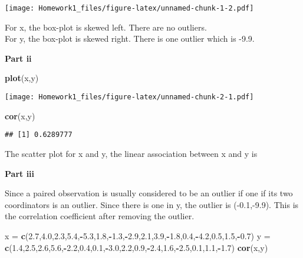 \documentclass[
]{article}
\newenvironment{Shaded}{\begin{snugshade}}{\end{snugshade}}
\newcommand{\FloatTok}[1]{\textcolor[rgb]{0.00,0.00,0.81}{#1}}
\newcommand{\FunctionTok}[1]{\textcolor[rgb]{0.13,0.29,0.53}{\textbf{#1}}}
\newcommand{\NormalTok}[1]{#1}
\newcommand{\OtherTok}[1]{\textcolor[rgb]{0.56,0.35,0.01}{#1}}
\newcommand{\SpecialCharTok}[1]{\textcolor[rgb]{0.81,0.36,0.00}{\textbf{#1}}}
\begin{document}
\texttt{[image: Homework1\_files/figure-latex/unnamed-chunk-1-2.pdf]}

For x, the box-plot is skewed left. There are no outliers.\\
For y, the box-plot is skewed right. There is one outlier which is -9.9.

\textbf{Part ii}

\begin{Shaded}
\begin{Highlighting}[]
\FunctionTok{plot}\NormalTok{(x,y)}
\end{Highlighting}
\end{Shaded}

\texttt{[image: Homework1\_files/figure-latex/unnamed-chunk-2-1.pdf]}

\begin{Shaded}
\begin{Highlighting}[]
\FunctionTok{cor}\NormalTok{(x,y)}
\end{Highlighting}
\end{Shaded}

\begin{verbatim}
## [1] 0.6289777
\end{verbatim}

The scatter plot for x and y, the linear association between x and y is

\textbf{Part iii}

Since a paired observation is usually considered to be an outlier if one
if its two coordinators is an outlier. Since there is one in y, the
outlier is (-0.1,-9.9). This is the correlation coefficient after
removing the outlier.

\begin{Shaded}
\begin{Highlighting}[]
\NormalTok{x }\OtherTok{=} \FunctionTok{c}\NormalTok{(}\FloatTok{2.7}\NormalTok{,}\FloatTok{4.0}\NormalTok{,}\FloatTok{2.3}\NormalTok{,}\FloatTok{5.4}\NormalTok{,}\SpecialCharTok{{-}}\FloatTok{5.3}\NormalTok{,}\FloatTok{1.8}\NormalTok{,}\SpecialCharTok{{-}}\FloatTok{1.3}\NormalTok{,}\SpecialCharTok{{-}}\FloatTok{2.9}\NormalTok{,}\FloatTok{2.1}\NormalTok{,}\FloatTok{3.9}\NormalTok{,}\SpecialCharTok{{-}}\FloatTok{1.8}\NormalTok{,}\FloatTok{0.4}\NormalTok{,}\SpecialCharTok{{-}}\FloatTok{4.2}\NormalTok{,}\FloatTok{0.5}\NormalTok{,}\FloatTok{1.5}\NormalTok{,}\SpecialCharTok{{-}}\FloatTok{0.7}\NormalTok{)}
\NormalTok{y }\OtherTok{=} \FunctionTok{c}\NormalTok{(}\FloatTok{1.4}\NormalTok{,}\FloatTok{2.5}\NormalTok{,}\FloatTok{2.6}\NormalTok{,}\FloatTok{5.6}\NormalTok{,}\SpecialCharTok{{-}}\FloatTok{2.2}\NormalTok{,}\FloatTok{0.4}\NormalTok{,}\FloatTok{0.1}\NormalTok{,}\SpecialCharTok{{-}}\FloatTok{3.0}\NormalTok{,}\FloatTok{2.2}\NormalTok{,}\FloatTok{0.9}\NormalTok{,}\SpecialCharTok{{-}}\FloatTok{2.4}\NormalTok{,}\FloatTok{1.6}\NormalTok{,}\SpecialCharTok{{-}}\FloatTok{2.5}\NormalTok{,}\FloatTok{0.1}\NormalTok{,}\FloatTok{1.1}\NormalTok{,}\SpecialCharTok{{-}}\FloatTok{1.7}\NormalTok{)}
\FunctionTok{cor}\NormalTok{(x,y)}
\end{Highlighting}
\end{Shaded}
\end{document}
